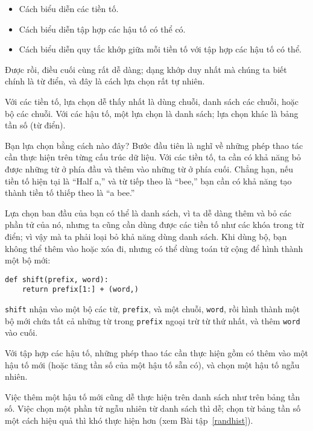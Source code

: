 \documentclass[11pt]{book}
\begin{document}
\begin{itemize}

\item Cách biểu diễn các tiền tố. 

\item Cách biểu diễn tập hợp các hậu tố có thể có. 

\item Cách biểu diễn quy tắc khớp giữa mỗi tiền tố với tập hợp các hậu tố có thể.

\end{itemize}

Được rồi, điều cuối cùng rất dễ dàng; dạng khớp duy nhất mà chúng ta biết
chính là từ điển, và đây là cách lựa chọn rất tự nhiên.

Với các tiền tố, lựa chọn dễ thấy nhất là dùng chuỗi, danh sách các chuỗi,
hoặc bộ các chuỗi. Với các hậu tố, một lựa chọn là danh sách; lựa chọn
khác là bảng tần số (từ điển).


Bạn lựa chọn bằng cách nào đây? Bước đầu tiên là nghĩ về những phép thao tác
cần thực hiện trên từng cấu trúc dữ liệu. Với các tiền tố, ta cần có khả năng
bỏ được những từ ở phía đầu và thêm vào những từ ở phía cuối. Chẳng hạn,
nếu tiền tố hiện tại là ``Half a,'' và từ tiếp theo là ``bee,'' bạn cần có khả năng
tạo thành tiền tố thiếp theo là ``a bee.''


Lựa chọn ban đầu của bạn có thể là danh sách, vì ta dễ dàng thêm và bỏ
các phần tử của nó, nhưng ta cũng cần dùng được các tiền tố như các
khóa trong từ điển; vì vậy mà ta phải loại bỏ khả năng dùng danh sách.
Khi dùng bộ, bạn không thể thêm vào hoặc xóa đi, nhưng có thể dùng
toán tử cộng để hình thành một bộ mới:

\beforeverb
\begin{verbatim}
def shift(prefix, word):
    return prefix[1:] + (word,)
\end{verbatim}
\afterverb
%
{\tt shift} nhận vào một bộ các từ, {\tt prefix}, và một chuỗi, 
{\tt word}, rồi hình thành một bộ mới chứa tất cả những từ trong
{\tt prefix} ngoại trừ từ thứ nhất, và thêm {\tt word} vào cuối.

Với tập hợp các hậu tố, những phép thao tác cần thực hiện gồm có
thêm vào một hậu tố mới (hoặc tăng tần số của một hậu tố sẵn có),
và chọn một hậu tố ngẫu nhiên.

Việc thêm một hậu tố mới cũng dễ thực hiện trên danh sách như
trên bảng tần số. Việc chọn một phần tử ngẫu nhiên từ danh sách 
thì dễ; chọn từ bảng tần số một cách hiệu quả thì khó thực hiện hơn
(xem Bài tập~\ref{randhist}).
\end{document}
